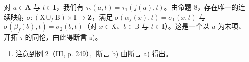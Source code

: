 对 \(a \in \mathbf{A}\) 与 \(t \in \mathbf{I}\)，我们有 \(\tau_2(a, t) = \tau_1(f(a), t)\)。由命题 8，存在唯一的连续映射 \(\sigma: (\mathrm{X} \cup_f \mathrm{B}) \times \mathbf{I} \to \mathbf{Z}\)，满足 \(\sigma(\alpha_f(x), t) = \sigma_1(x, t)\) 与 \(\sigma(\beta_f(b), t) = \sigma_2(b, t)\)（对 \(x \in \mathrm{X}\)、\(b \in \mathrm{B}\) 与 \(t \in \mathbf{I}\)）。这是一个以 \(u\) 为末项、开拓 \(\tau\) 的同伦，由此得断言 a)。

\begin{enumerate}
\def\labelenumi{\alph{enumi})}
\setcounter{enumi}{1}
\tightlist
\item
  注意到例 2（III, p. 249），断言 b) 由断言 a) 得出。
\end{enumerate}

